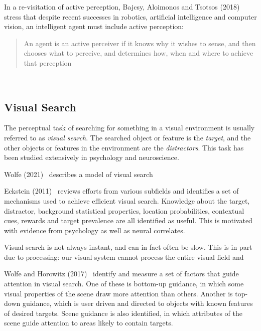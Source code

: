 In a re-visitation of active perception, Bajcsy, Aloimonos and Tsotsos (2018)~\cite{bajcsy_aloimonos_tsotsos_2018} stress that despite recent successes in robotics, artificial intelligence and computer vision, an intelligent agent must include active perception:

\begin{quote}
    An agent is an active perceiver if it knows why it wishes to sense, and then chooses what to perceive, and determines how, when and where to achieve that perception
\end{quote}~\cite{bajcsy_aloimonos_tsotsos_2018}


\subsection{Visual Search}
\label{sec:visualsearch}


The perceptual task of searching for something in a visual environment is usually referred to as \textit{visual search}.
The searched object or feature is the \textit{target}, and the other objects or features in the environment are the \textit{distractors}.
This task has been studied extensively in psychology and neuroscience.

Wolfe (2021)~\cite{wolfe_guided_2021} describes a model of visual search


Eckstein (2011)~\cite{eckstein_visual_2011} reviews efforts from various subfields and identifies a set of mechanisms used to achieve efficient visual search.
Knowledge about the target, distractor, background statistical properties, location probabilities, contextual cues, rewards and target prevalence are all identified as useful.
This is motivated with evidence from psychology as well as neural correlates.

Visual search is not always instant, and can in fact often be slow.
This is in part due to processing: our visual system cannot process the entire visual field and 


Wolfe and Horowitz (2017)~\cite{wolfe_horowitz_2017} identify and measure a set of factors that guide attention in visual search.
One of these is bottom-up guidance, in which some visual properties of the scene draw more attention than others.
Another is top-down guidance, which is user driven and directed to objects with known features of desired targets.
Scene guidance is also identified, in which attributes of the scene guide attention to areas likely to contain targets. 

